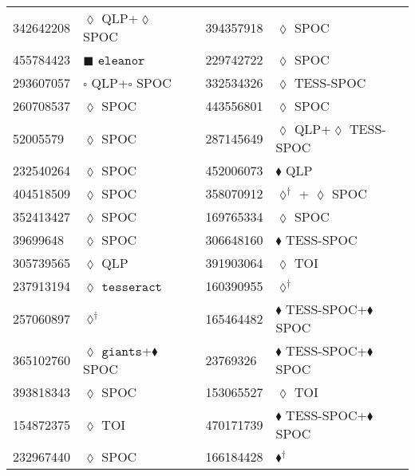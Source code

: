 \begin{longtable}{llrllr}
342642208 & $\lozenge$ QLP+$\lozenge$ SPOC & \cite{TIC_393831507} & 394357918 & $\lozenge$ SPOC & \cite{TIC_441738827} \\
455784423 & $\blacksquare$ $\texttt{eleanor}$ & \cite{TIC_155867025} & 229742722 & $\lozenge$ SPOC & \cite{TIC_229742722} \\
293607057 & $\square$ QLP+$\square$ SPOC& \cite{TIC_293607057} & 332534326 & $\lozenge$ TESS-SPOC & \cite{TIC_332534326} \\
260708537 & $\lozenge$ SPOC & \cite{TIC_260708537} & 443556801 & $\lozenge$ SPOC & \cite{TIC_348755728} \\
52005579 & $\lozenge$ SPOC & \cite{TIC_52005579} & 287145649 & $\lozenge$ QLP+$\lozenge$ TESS-SPOC & \cite{TIC_332534326} \\
232540264 & $\lozenge$ SPOC & \cite{TIC_232540264} & 452006073 & $\blacklozenge$ QLP & \cite{TIC_439366538} \\
404518509 & $\lozenge$ SPOC & \cite{TIC_404518509} & 358070912 & $\lozenge^\dagger$ + $\lozenge$ SPOC & \cite{TIC_358070912} \\
352413427 & $\lozenge$ SPOC & \cite{TIC_232540264} & 169765334 & $\lozenge$ SPOC & \cite{TIC_232540264} \\
39699648 & $\lozenge$ SPOC & \cite{TIC_232540264} & 306648160 & $\blacklozenge$ TESS-SPOC & \cite{TIC_446549906} \\
305739565 & $\lozenge$ QLP & \cite{TIC_305739565} & 391903064 & $\lozenge$ TOI & \cite{TIC_154872375} \\
237913194 & $\lozenge$ $\texttt{tesseract}$ & \cite{TIC_237913194} & 160390955 & $\lozenge^\dagger$ & \cite{TIC_160390955} \\
257060897 & $\lozenge^\dagger$ & \cite{TIC_257060897} & 165464482 & $\blacklozenge$ TESS-SPOC+$\blacklozenge$ SPOC & \cite{TIC_446549906} \\
365102760 & $\lozenge$ $\texttt{giants}$+$\blacklozenge$ SPOC & \cite{TIC_365102760} & 23769326 & $\blacklozenge$ TESS-SPOC+$\blacklozenge$ SPOC & \cite{TIC_446549906} \\
393818343 & $\lozenge$ SPOC & \cite{TIC_393818343} & 153065527 & $\lozenge$ TOI & \cite{TIC_154872375} \\
154872375 & $\lozenge$ TOI & \cite{TIC_154872375} & 470171739 & $\blacklozenge$ TESS-SPOC+$\blacklozenge$ SPOC & \cite{TIC_446549906} \\
232967440 & $\lozenge$ SPOC & \cite{TIC_232967440} & 166184428 & $\blacklozenge^\dagger$ & \cite{TIC_166184428} \\

\end{longtable}
